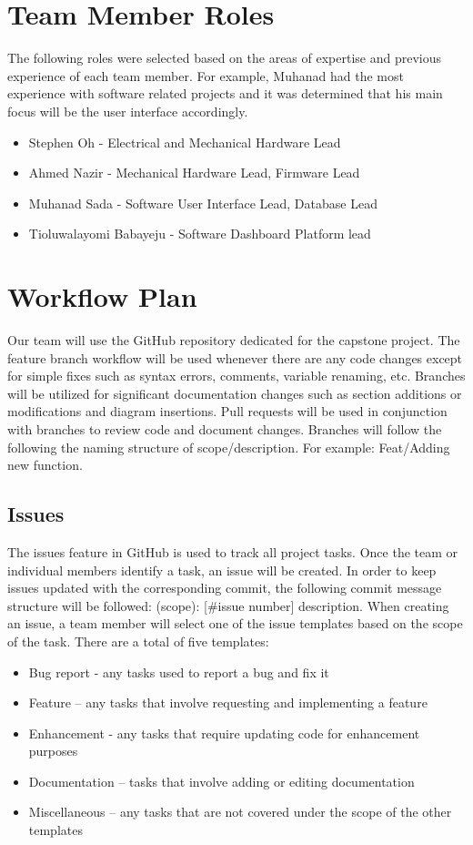 \documentclass[12pt]{article}
\begin{document}
\section{Team Member Roles}
The following roles were selected based on the areas of expertise and previous experience of each team member. 
For example, Muhanad had the most experience with software related projects and it was determined that his main focus will be the user interface accordingly.
\begin{itemize}
	\item Stephen Oh - Electrical and Mechanical Hardware Lead
	\item Ahmed Nazir - Mechanical Hardware Lead, Firmware Lead
	\item Muhanad Sada - Software User Interface Lead, Database Lead
	\item Tioluwalayomi Babayeju - Software Dashboard Platform lead
\end{itemize}


\section{Workflow Plan}
Our team will use the GitHub repository dedicated for the capstone project. The feature
branch workflow will be used whenever there are any code changes except for simple fixes such as syntax errors, comments, variable renaming, etc. 
Branches will be utilized for significant documentation changes such as section additions or modifications and diagram insertions. 
Pull requests will be used in conjunction with branches to review code and document changes.
Branches will follow the following the naming structure of scope/description. For example: Feat/Adding new function.

\subsection{Issues}
The issues feature in GitHub is used to track all project tasks. Once the team or individual members identify a task, an issue will be created. In order to keep issues updated with the corresponding commit, the following commit message structure will be followed: (scope): [\#issue number] description. When creating an issue, a team member will select one of the issue templates based on the scope of the task. There are a total of five templates: 

\begin{itemize}
	\item Bug report - any tasks used to report a bug and fix it
	\item Feature – any tasks that involve requesting and implementing a feature
	\item Enhancement - any tasks that require updating code for enhancement purposes
	\item Documentation – tasks that involve adding or editing documentation
	\item Miscellaneous – any tasks that are not covered under the scope of the other templates
\end{itemize}
\end{document}
